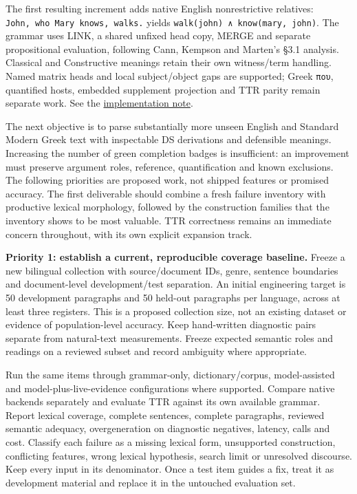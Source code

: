 \documentclass[11pt,a4paper]{article}
\begin{document}
The first resulting increment adds native English nonrestrictive
relatives: \texttt{John,\ who\ Mary\ knows,\ walks.} yields
\texttt{walk(john)\ ∧\ know(mary,\ john)}. The grammar uses LINK, a
shared unfixed head copy, MERGE and separate propositional evaluation,
following Cann, Kempson and Marten's §3.1 analysis. Classical and
Constructive meanings retain their own witness/term handling. Named
matrix heads and local subject/object gaps are supported; Greek
\texttt{που}, quantified hosts, embedded supplement projection and TTR
parity remain separate work. See the
\href{design/nonrestrictive-relatives.md}{implementation note}.

The next objective is to parse substantially more unseen English and
Standard Modern Greek text with inspectable DS derivations and
defensible meanings. Increasing the number of green completion badges is
insufficient: an improvement must preserve argument roles, reference,
quantification and known exclusions. The following priorities are
proposed work, not shipped features or promised accuracy. The first
deliverable should combine a fresh failure inventory with productive
lexical morphology, followed by the construction families that the
inventory shows to be most valuable. TTR correctness remains an
immediate concern throughout, with its own explicit expansion track.

\textbf{Priority 1: establish a current, reproducible coverage
baseline.} Freeze a new bilingual collection with source/document IDs,
genre, sentence boundaries and document-level development/test
separation. An initial engineering target is 50 development paragraphs
and 50 held-out paragraphs per language, across at least three
registers. This is a proposed collection size, not an existing dataset
or evidence of population-level accuracy. Keep hand-written diagnostic
pairs separate from natural-text measurements. Freeze expected semantic
roles and readings on a reviewed subset and record ambiguity where
appropriate.

Run the same items through grammar-only, dictionary/corpus,
model-assisted and model-plus-live-evidence configurations where
supported. Compare native backends separately and evaluate TTR against
its own available grammar. Report lexical coverage, complete sentences,
complete paragraphs, reviewed semantic adequacy, overgeneration on
diagnostic negatives, latency, calls and cost. Classify each failure as
a missing lexical form, unsupported construction, conflicting features,
wrong lexical hypothesis, search limit or unresolved discourse. Keep
every input in its denominator. Once a test item guides a fix, treat it
as development material and replace it in the untouched evaluation set.
\end{document}
